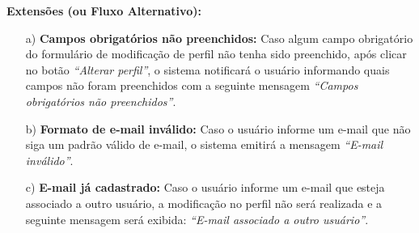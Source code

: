 \begin{quadro}[H]
\begin{framed}
\begin{flushleft}
		\textbf{Extensões (ou Fluxo Alternativo):}
		\begin{itemize}
			\item[a)] \textbf{Campos obrigatórios não preenchidos:} Caso algum campo obrigatório do formulário de modificação de perfil não tenha sido preenchido, após clicar no botão \textit{``Alterar perfil''}, o sistema notificará o usuário informando quais campos não foram preenchidos com a seguinte mensagem \textit{``Campos obrigatórios não preenchidos''}.
			\item[b)] \textbf{Formato de e-mail inválido:} Caso o usuário informe um e-mail que não siga um padrão válido de e-mail, o sistema emitirá a mensagem \textit{``E-mail inválido''}.
			\item[c)] \textbf{E-mail já cadastrado:} Caso o usuário informe um e-mail que esteja associado a outro usuário, a modificação no perfil não será realizada e a seguinte mensagem será exibida: \emph{``E-mail associado a outro usuário''}.
		\end{itemize}


		\end{flushleft}

	\end{framed}

\end {quadro} %

